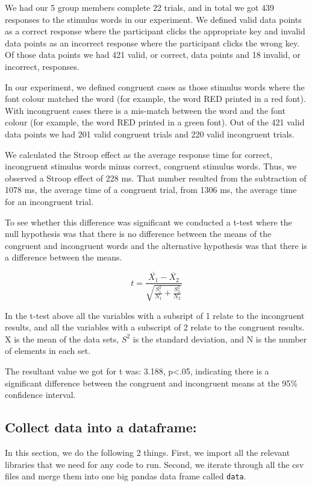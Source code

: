 \documentclass{article}
\begin{document}
We had our 5 group members complete 22 trials, and in total we got 439 responses to the stimulus words in our experiment. We defined valid data points as a correct response where the participant clicks the appropriate key and invalid data points as an incorrect response where the participant clicks the wrong key. Of those data points we had 421 valid, or correct, data points and 18 invalid, or incorrect, responses.

In our experiment, we defined congruent cases as those stimulus words where the font colour matched the word (for example, the word RED printed in a red font). With incongruent cases there is a mis-match between the word and the font colour (for example, the word RED printed in a green font). Out of the 421 valid data points we had 201 valid congruent trials and 220 valid incongruent trials.

We calculated the Stroop effect as the average response time for correct, incongruent stimulus words minus correct, congruent stimulus words. Thus, we observed a Stroop effect of 228 ms. That number resulted from the subtraction of 1078 ms, the average time of a congruent trial, from  1306 ms, the average time for an incongruent trial.

To see whether this difference was significant we conducted a t-test where the null hypothesis was that there is no difference between the means of the congruent and incongruent words and the alternative hypothesis was that there is a difference between the means.

\[ t = \frac{ \overline{X_1} - \overline{X_2}} { \sqrt{ \frac{S_1^2}{N_1} + \frac{S_2^2}{N_2}} } \]

In the t-test above all the variables with a subsript of 1 relate to the incongruent results, and all the variables with a subscript of 2 relate to the congruent results. X is the mean of the data sets, \(S^2\) is the standard deviation, and N is the number of elements in each set.

The resultant value we got for t was: 3.188, p<.05, indicating there is a significant difference between the congruent and incongruent means at the 95\% confidence interval.


\subsection{Collect data into a dataframe:}
\label{sec:org43c4b29}

In this section, we do the following 2 things. First, we import all the relevant libraries that we need for any code to run. Second, we iterate through all the csv files and merge them into one big pandas data frame called \texttt{data}.
\end{document}
